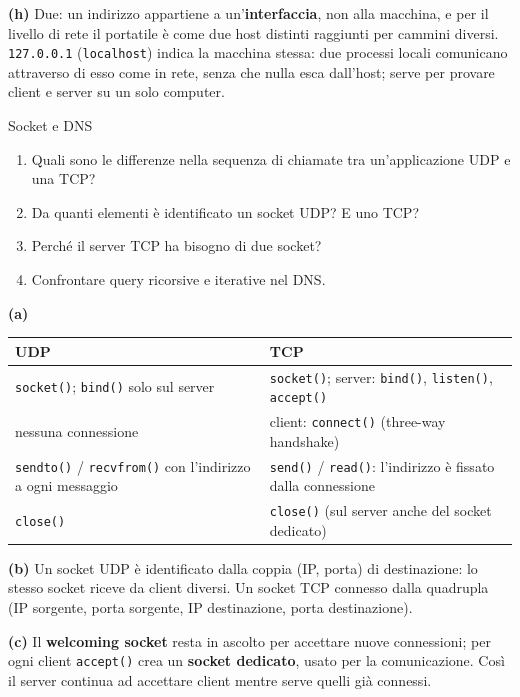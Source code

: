 \textbf{(h)} Due: un indirizzo appartiene a un'\textbf{interfaccia}, non alla macchina, e per il livello di rete il portatile è come
due host distinti raggiunti per cammini diversi. \texttt{127.0.0.1} (\texttt{localhost}) indica la macchina stessa: due processi
locali comunicano attraverso di esso come in rete, senza che nulla esca dall'host; serve per provare client e server su un solo computer.

\begin{esercizio}{Socket e DNS}
\begin{enumerate}[label=(\alph*)]
    \item Quali sono le differenze nella sequenza di chiamate tra un'applicazione UDP e una TCP?
    \item Da quanti elementi è identificato un socket UDP? E uno TCP?
    \item Perché il server TCP ha bisogno di due socket?
    \item Confrontare query ricorsive e iterative nel DNS.
\end{enumerate}
\end{esercizio}

\svolgimento
\textbf{(a)}
\begin{center}
\small
\begin{tabular}{p{6.5cm}p{6.5cm}}
\toprule
\textbf{UDP} & \textbf{TCP} \\
\midrule
\texttt{socket()}; \texttt{bind()} solo sul server & \texttt{socket()}; server: \texttt{bind()}, \texttt{listen()}, \texttt{accept()} \\
nessuna connessione & client: \texttt{connect()} (three-way handshake) \\
\texttt{sendto()} / \texttt{recvfrom()} con l'indirizzo a ogni messaggio & \texttt{send()} / \texttt{read()}: l'indirizzo è fissato dalla connessione \\
\texttt{close()} & \texttt{close()} (sul server anche del socket dedicato) \\
\bottomrule
\end{tabular}
\end{center}

\textbf{(b)} Un socket UDP è identificato dalla coppia (IP, porta) di destinazione: lo stesso socket riceve da client diversi. Un socket TCP
connesso dalla quadrupla (IP sorgente, porta sorgente, IP destinazione, porta destinazione).

\textbf{(c)} Il \textbf{welcoming socket} resta in ascolto per accettare nuove connessioni; per ogni client \texttt{accept()} crea un
\textbf{socket dedicato}, usato per la comunicazione. Così il server continua ad accettare client mentre serve quelli già connessi.

